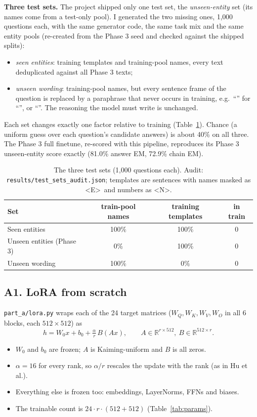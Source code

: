 \textbf{Three test sets.} The project shipped only one test set, the \emph{unseen-entity} set (its names come from a test-only pool). I generated the two missing ones, 1,000 questions each, with the same generator code, the same task mix and the same entity pools (re-created from the Phase 3 seed and checked against the shipped splits):
\begin{itemize}[leftmargin=*,nosep]
\item \emph{seen entities}: training templates and training-pool names, every text deduplicated against all Phase 3 texts;
\item \emph{unseen wording}: training-pool names, but every sentence frame of the question is replaced by a paraphrase that never occurs in training, e.g.\ ``'' for ``'', or ``''. The reasoning the model must write is unchanged.
\end{itemize}
Each set changes exactly one factor relative to training (Table~\ref{tab:sets}). Chance (a uniform guess over each question's candidate answers) is about 40\% on all three. The Phase 3 full finetune, re-scored with this pipeline, reproduces its Phase 3 unseen-entity score exactly (81.0\% answer EM, 72.9\% chain EM).

\begin{table}[h]
\centering\footnotesize
\caption{The three test sets (1,000 questions each). Audit: \texttt{results/test\_sets\_audit.json}; templates are sentences with names masked as \textless E\textgreater\ and numbers as \textless N\textgreater.}
\label{tab:sets}
\begin{tabular}{lccc}
\toprule
Set & train-pool names & training templates & in train\\
\midrule
Seen entities & 100\% & 100\% & 0\\
Unseen entities (Phase 3) & 0\% & 100\% & 0\\
Unseen wording & 100\% & 0\% & 0\\
\bottomrule
\end{tabular}
\end{table}

\subsection*{A1. LoRA from scratch}
\texttt{part\_a/lora.py} wraps each of the 24 target matrices ($W_Q,W_K,W_V,W_O$ in all 6 blocks, each $512\times512$) as
\[ h = W_0x+b_0+\tfrac{\alpha}{r}\,B(Ax),\qquad A\in\mathbb{R}^{r\times512},\ B\in\mathbb{R}^{512\times r}. \]
\begin{itemize}[leftmargin=*,nosep]
\item $W_0$ and $b_0$ are frozen; $A$ is Kaiming-uniform and $B$ is all zeros.
\item $\alpha=16$ for every rank, so $\alpha/r$ rescales the update with the rank (as in Hu et al.).
\item Everything else is frozen too: embeddings, LayerNorms, FFNs and biases.
\item The trainable count is $24\cdot r\cdot(512+512)$ (Table~\ref{tab:params}).
\end{itemize}

